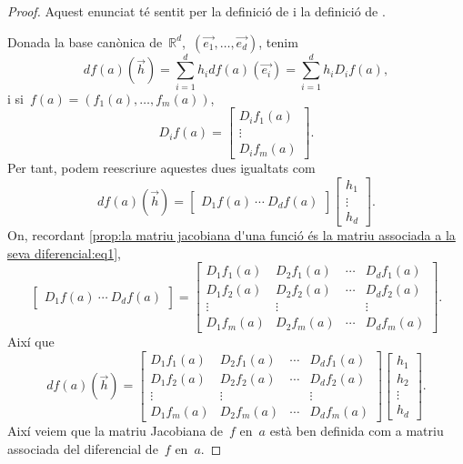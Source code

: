 \documentclass[../../main.tex]{subfiles}
\begin{document}
    \begin{proof}
        Aquest enunciat té sentit per la definició de  i la definició de .

        Donada la base canònica de~\(\mathbb{R}^{d}\),~\((\vec{e_{1}},\dots,\vec{e_{d}})\), tenim
        \[
            df(a)(\vec{h})=\sum_{i=1}^{d}h_{i}df(a)(\vec{e_{i}})=\sum_{i=1}^{d}h_{i}D_{i}f(a),
        \]
        i si~\(f(a)=(f_{1}(a),\dots,f_{m}(a))\),
        \begin{equation}\label{prop:la matriu jacobiana d'una funció és la matriu associada a la seva diferencial:eq1}
        D_{i}f(a)=
        \left[\begin{matrix}
        D_{i}f_{1}(a)\\
        \vdots\\
        D_{i}f_{m}(a)
        \end{matrix}\right].
        \end{equation}
        Per tant, podem reescriure aquestes dues igualtats com
        \[df(a)(\vec{h})=
        \left[\begin{matrix}
        D_{1}f(a)~\cdots~D_{d}f(a)
        \end{matrix}\right]
        \left[\begin{matrix}
        h_{1}\\\vdots\\h_{d}
        \end{matrix}
        \right].\]
        On, recordant \eqref{prop:la matriu jacobiana d'una funció és la matriu associada a la seva diferencial:eq1},
        \[\left[\begin{matrix}
        D_{1}f(a)~\cdots~D_{d}f(a)
        \end{matrix}\right]=
        \left[\begin{matrix}
        D_{1}f_{1}(a) & D_{2}f_{1}(a) & \cdots & D_{d}f_{1}(a)\\
        D_{1}f_{2}(a) & D_{2}f_{2}(a) & \cdots & D_{d}f_{2}(a)\\
        \vdots & \vdots && \vdots \\
        D_{1}f_{m}(a) & D_{2}f_{m}(a) & \cdots & D_{d}f_{m}(a)
        \end{matrix}\right].\]
        Així que
        \[df(a)(\vec{h})=
        \left[\begin{matrix}
        D_{1}f_{1}(a) & D_{2}f_{1}(a) & \cdots & D_{d}f_{1}(a)\\
        D_{1}f_{2}(a) & D_{2}f_{2}(a) & \cdots & D_{d}f_{2}(a)\\
        \vdots & \vdots && \vdots \\
        D_{1}f_{m}(a) & D_{2}f_{m}(a) & \cdots & D_{d}f_{m}(a)
        \end{matrix}\right]
        \left[\begin{matrix}
        h_{1}\\h_{2}\\\vdots\\h_{d}
        \end{matrix}
        \right].\]
        Així veiem que la matriu Jacobiana de~\(f\) en~\(a\) està ben definida com a matriu associada del diferencial de~\(f\) en~\(a\).
    \end{proof}
\end{document}
